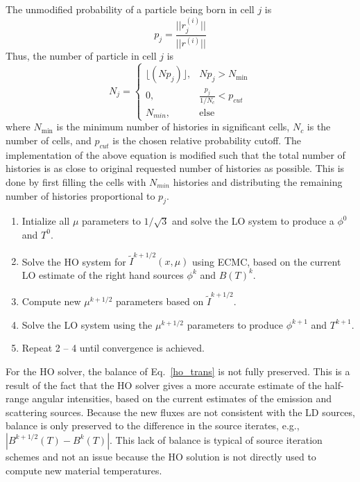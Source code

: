 \documentclass{mc2013}
\begin{document}
The unmodified probability of a particle being born in cell $j$ is 
\begin{equation}
p_j = \frac{||r^{(i)}_j||}{||r^{(i)}||}
\end{equation}
Thus, the number of
particle in cell $j$ is 
\begin{equation}
N_j = 
\left\{\begin{matrix}
 \lfloor(Np_j)\rfloor, & Np_j > N_{\min}
\\ 0, & \frac{p_j}{1/N_c} < p_{cut}
\\ N_{min}, & \text{else}
\end{matrix}\right.
\end{equation}
where $N_{\min}$ is the minimum number of histories in significant cells, $N_c$  is the number of cells, and $p_{cut}$ is the chosen relative probability cutoff.
 The implementation of the above equation is modified such that the total number of histories is as
close to original requested number of histories as possible. This is done by first filling the cells with $N_{min}$ histories and distributing the remaining number of histories proportional to $p_j$.



\begin{enumerate}
\item Intialize all $\mu$ parameters to $1/\sqrt{3}$ and solve the LO system to
produce a $\phi^{0}$ and $T^0$.
\item Solve the HO system for $\tilde{I}^{k+1/2}(x,\mu)$ using ECMC, based on the current
LO estimate of the right hand sources $\phi^{k}$ and $B(T)^{k}$.
\item Compute new $\mu^{k+1/2}$ parameters based on $\tilde{I}^{k+1/2}$.  
\item Solve the LO system using the $\mu^{k+1/2}$ parameters to produce
$\phi^{k+1}$ and $T^{k+1}$.
\item Repeat 2 -- 4 until convergence is achieved.
\end{enumerate}


For the HO solver, the balance of Eq.~\eqref{ho_trans} is not fully preserved.  This
is a result of the fact that the HO solver gives a more accurate estimate of the
half-range angular intensities, based on the current estimates of the emission and scattering
sources.  Because the new fluxes are not consistent with the LD sources, balance is
only preserved to the difference in
the source iterates, e.g., $|B^{k+1/2}(T) - B^{k}(T)|$.  This lack of balance
is typical of source iteration schemes and not an issue because
the HO solution is not directly used to compute new material temperatures.
\end{document}
